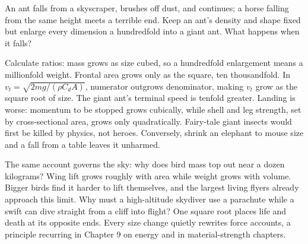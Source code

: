 
\begin{thought}
An ant falls from a skyscraper, brushes off dust, and continues; a horse falling from the same height meets a terrible end. Keep an ant's density and shape fixed but enlarge every dimension a hundredfold into a giant ant. What happens when it falls?

Calculate ratios: mass grows as size cubed, so a hundredfold enlargement means a millionfold weight. Frontal area grows only as the square, ten thousandfold. In \(v_t=\sqrt{2mg/(\rho C_d A)}\), numerator outgrows denominator, making \(v_t\) grow as the square root of size. The giant ant's terminal speed is tenfold greater. Landing is worse: momentum to be stopped grows cubically, while shell and leg strength, set by cross-sectional area, grows only quadratically. Fairy-tale giant insects would first be killed by physics, not heroes. Conversely, shrink an elephant to mouse size and a fall from a table leaves it unharmed.

The same account governs the sky: why does bird mass top out near a dozen kilograms? Wing lift grows roughly with area while weight grows with volume. Bigger birds find it harder to lift themselves, and the largest living flyers already approach this limit. Why must a high-altitude skydiver use a parachute while a swift can dive straight from a cliff into flight? One square root places life and death at its opposite ends. Every size change quietly rewrites force accounts, a principle recurring in Chapter 9 on energy and in material-strength chapters.
\end{thought}

